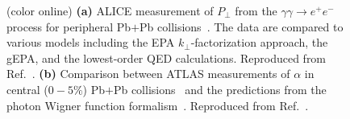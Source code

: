 \documentclass[twocolumn,epjc3]{svjour3}\sloppy
\begin{document}
\begin{figure}
    \caption{ (color online) \textbf{(a)} ALICE measurement of $P_\perp$ from the $\gamma\gamma \rightarrow e^+e^-$ process for peripheral Pb$+$Pb collisions~\cite{lehnerDielectronProductionLow2019a}. The data are compared to various models including the EPA $k_\perp$-factorization approach, the gEPA, and the lowest-order QED calculations. Reproduced from Ref.~\cite{lehnerDielectronProductionLow2019a}.
    \textbf{(b)} Comparison between ATLAS measurements of $\alpha$ in central ($0-5\%$) Pb$+$Pb collisions~\cite{atlascollaborationObservationCentralityDependentAcoplanarity2018a} and the predictions from the photon Wigner function formalism~\cite{klusek-gawendaCentralityDependenceDilepton2021}. Reproduced from Ref.~\cite{klusek-gawendaCentralityDependenceDilepton2021}.
    }
    \label{fig:exp_hadronic}
\end{figure}
\end{document}
